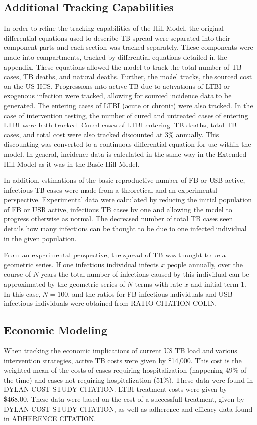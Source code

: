 \documentclass{amsart}
\begin{document}
\subsection{Additional Tracking Capabilities}
In order to refine the tracking capabilities of the
Hill Model, the original differential equations used to describe TB spread were
separated into their component parts and each section was tracked separately.
These components were made into compartments, tracked by differential equations
detailed in the appendix. These equations allowed the model to track the total
number of TB cases, TB deaths, and  natural deaths. Further, the model tracks,
the sourced cost on the US HCS. Progressions into
active TB due to activations of LTBI or exogenous infection were tracked,
allowing for sourced incidence data to be generated. The entering cases of LTBI
(acute or chronic) were also tracked. In the case of intervention testing, the
number of cured and untreated cases of entering LTBI were both tracked. Cured
cases of LTBI entering, TB deaths, total TB cases, and total cost were also
tracked discounted at 3\% annually. This discounting was converted to a
continuous differential equation for use within the model. In general, incidence
data is calculated in the same way in the Extended Hill Model as it was in the Basic
Hill Model.

In addition, estimations of the basic reproductive number of FB or USB active,
infectious TB cases were made from a theoretical and an experimental
perspective. Experimental data were calculated by reducing the initial
population of FB or USB active, infectious TB cases by one and allowing the
model to progress otherwise as normal. The decreased number of total TB cases
seen details how many infections can be thought to be due to one infected
individual in the given population.

From an experimental perspective, the spread of TB was thought to be a geometric
series. If one infectious individual infects $x$ people annually, over the
course of $N$ years the total number of infections caused by this individual can
be approximated by the geometric series of $N$ terms with rate $x$ and initial
term $1$. In this case, $N = 100$, and the ratios for FB infectious individuals
and USB infectious individuals were obtained from RATIO CITATION COLIN. 
\subsection{Economic Modeling}
When tracking the economic implications of current US TB load and various
intervention strategies, active TB costs were given by \$14,000. This cost is
the weighted mean of the costs of cases requiring hospitalization (happening
49\% of the time) and cases not requiring hospitalization (51\%). These data
were found in DYLAN COST STUDY CITATION. LTBI treatment costs were given by
\$468.00. These data were based on the cost of a successfull treatment, given by
DYLAN COST STUDY CITATION, as well as adherence and efficacy data found in
ADHERENCE CITATION.
\end{document}
